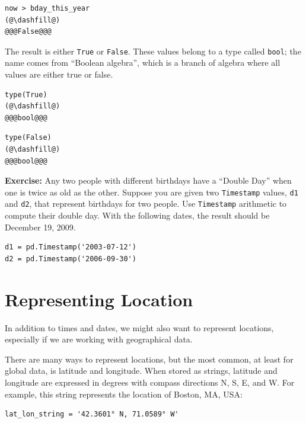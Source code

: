 \begin{lstlisting}[]
now > bday_this_year
(@\dashfill@)
@@@False@@@
\end{lstlisting}

The result is either \passthrough{\lstinline!True!} or
\passthrough{\lstinline!False!}. These values belong to a type called
\passthrough{\lstinline!bool!}; the name comes from ``Boolean algebra'',
which is a branch of algebra where all values are either true or false.

\begin{lstlisting}[]
type(True)
(@\dashfill@)
@@@bool@@@
\end{lstlisting}

\begin{lstlisting}[]
type(False)
(@\dashfill@)
@@@bool@@@
\end{lstlisting}

\textbf{Exercise:} Any two people with different birthdays have a
``Double Day'' when one is twice as old as the other. Suppose you are
given two \passthrough{\lstinline!Timestamp!} values,
\passthrough{\lstinline!d1!} and \passthrough{\lstinline!d2!}, that
represent birthdays for two people. Use
\passthrough{\lstinline!Timestamp!} arithmetic to compute their double
day. With the following dates, the result should be December 19, 2009.

\begin{lstlisting}[]
d1 = pd.Timestamp('2003-07-12')
d2 = pd.Timestamp('2006-09-30')
\end{lstlisting}

\hypertarget{representing-location}{%
\section{Representing Location}\label{representing-location}}

In addition to times and dates, we might also want to represent
locations, especially if we are working with geographical data.

There are many ways to represent locations, but the most common, at
least for global data, is latitude and longitude. When stored as
strings, latitude and longitude are expressed in degrees with compass
directions N, S, E, and W. For example, this string represents the
location of Boston, MA, USA:

\begin{lstlisting}[]
lat_lon_string = '42.3601° N, 71.0589° W'
\end{lstlisting}

